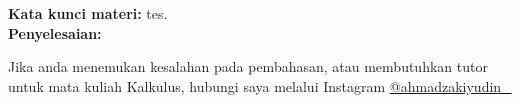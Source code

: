 \documentclass[10pt,openany,a4paper]{article}
\theoremstyle{definition}
\theoremstyle{definition}
\theoremstyle{plain}
\newenvironment{jawab}[2][tes]{
\textbf{Kata kunci materi:} #1.\\
\textbf{Penyelesaian:} #2
}{}
\begin{document}
\begin{enumerate}
\begin{jawab}
{\begin{enumerate}
                        \end{enumerate}
                }
                    \end{jawab}
                    \end{enumerate}
\vfill
\vspace{1mm}
\begin{center}
     Jika anda menemukan kesalahan pada pembahasan, 
atau membutuhkan tutor untuk mata kuliah Kalkulus, hubungi saya melalui Instagram \href{https://instagram.com/ahmadzakiyudin_/}{@ahmadzakiyudin\_} 
\end{center}
                    
\end{document}
